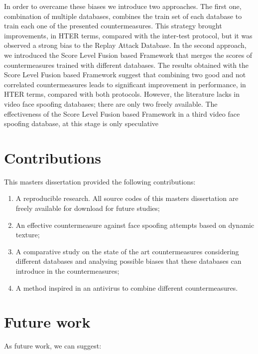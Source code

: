 In order to overcame these biases we introduce two approaches. The first one, combination of multiple databases, combines the train set of each database to train each one of the presented countermeasures. This strategy brought improvements, in HTER terms, compared with the inter-test protocol, but it was observed a strong bias to the Replay Attack Database. In the second approach, we introduced the Score Level Fusion based Framework that merges the scores of countermeasures trained with different databases. The results obtained with the Score Level Fusion based Framework suggest that combining two good and not correlated countermeasures leads to significant improvement in performance, in HTER terms, compared with both protocols. However, the literature lacks in video face spoofing databases; there are only two freely available. The effectiveness of the Score Level Fusion based Framework in a third video face spoofing database, at this stage is only speculative

\section{Contributions}

This masters dissertation provided the following contributions:

\begin{enumerate}
	\item A reproducible research. All source codes of this masters dissertation are freely available for download for future studies;
	\item An effective countermeasure against face spoofing attempts based on dynamic texture; 
	\item A comparative study on the state of the art countermeasures considering different databases and analysing possible biases that these databases can introduce in the countermeasures;
	\item A method inspired in an antivirus to combine different countermeasures.
\end{enumerate}


\section{Future work}

As future work, we can suggest:

